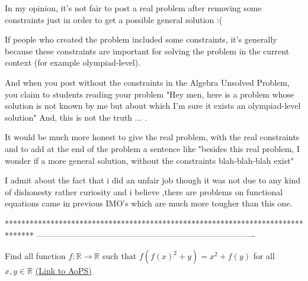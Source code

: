 \begin{solution}
	In my opinion, it's not fair to post a real problem after removing some constraints just in order to get a possible general solution :(

If people who created the problem included some constraints, it's generally because these constraints are important for solving the problem in the current context (for example olympiad-level).

And when you post without the constraints in the Algebra Unsolved Problem, you claim to students reading your problem "Hey men, here is a problem whose solution is not known by me but about which I'm sure it exists an olympiad-level solution"
And, this is not the truth ... .

It would be much more honest to give the real problem, with the real constraints and to add at the end of the problem a sentence like "besides this real problem, I wonder if a more general solution, without the constraints blah-blah-blah exist"
\end{solution}



\begin{solution}
	I admit about the fact that i did an unfair job though it was not due to any kind of dishonesty rather curiosity and i believe ,there are problems on functional equations came in previous IMO's which are much more tougher than this one.
\end{solution}
*******************************************************************************
-------------------------------------------------------------------------------

\begin{problem}
	Find all function $f : \mathbb{R} \rightarrow \mathbb{R}$ such that $f(f(x)^2 + y) = x^2 + f(y)$ for all $x, y \in \mathbb{R}$
	\flushright \href{https://artofproblemsolving.com/community/c6h485330}{(Link to AoPS)}
\end{problem}



